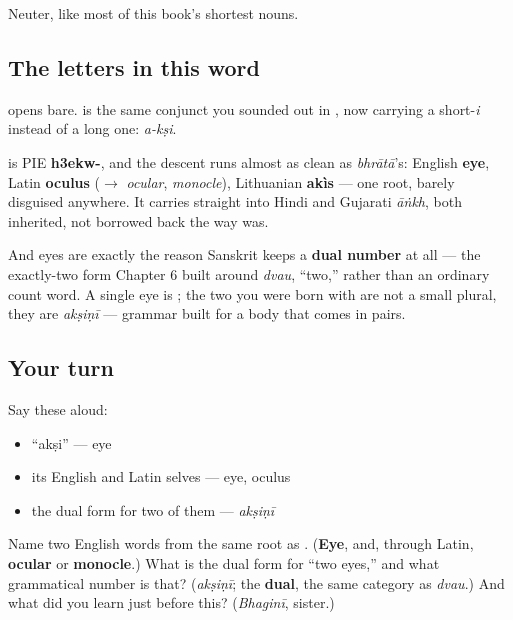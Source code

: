 Neuter, like most of this book's shortest nouns.

\subsection*{The letters in this word}
\textbf{} opens bare. \textbf{} is the same \textbf{} conjunct you sounded out in \textbf{}, now carrying a short-\emph{i} instead of a long one: \emph{a-kṣi}.

\begin{cousinweb}
\textbf{} is PIE \textbf{h3ekw-}, and the descent runs almost as clean as \emph{bhrātā}'s: English \textbf{eye}, Latin \textbf{oculus} ($\to$ \emph{ocular}, \emph{monocle}), Lithuanian \textbf{akìs} — one root, barely disguised anywhere. It carries straight into Hindi and Gujarati \emph{āṅkh}, both inherited, not borrowed back the way \textbf{} was.

And eyes are exactly the reason Sanskrit keeps a \textbf{dual number} at all — the exactly-two form Chapter 6 built around \emph{dvau}, \textquotedblleft{}two,\textquotedblright{} rather than an ordinary count word. A single eye is \textbf{}; the two you were born with are not a small plural, they are \emph{akṣiṇī} — grammar built for a body that comes in pairs.
\end{cousinweb}

\subsection*{Your turn}
Say these aloud:

\begin{itemize}
\raggedright
  \item \textquotedblleft{}akṣi\textquotedblright{} — eye
  \item its English and Latin selves — eye, oculus
  \item the dual form for two of them — \emph{akṣiṇī}
\end{itemize}

\begin{tcolorbox}[breakable,colback=teal!4,colframe=teal!35!black,title={Before you move on}]
Name two English words from the same root as . (\textbf{Eye}, and, through Latin, \textbf{ocular} or \textbf{monocle}.) What is the dual form for \textquotedblleft{}two eyes,\textquotedblright{} and what grammatical number is that? (\emph{akṣiṇī}; the \textbf{dual}, the same category as \emph{dvau}.) And what did you learn just before this? (\emph{Bhaginī}, sister.)
\end{tcolorbox}
